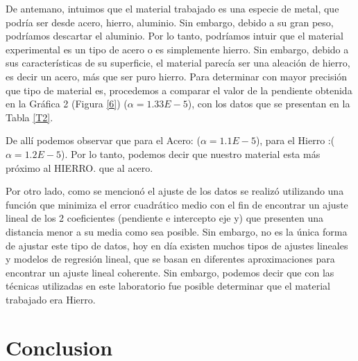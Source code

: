 \documentclass[journal,transmag]{IEEEtran}
\begin{document}
  

De antemano, intuimos que el material trabajado es una especie de metal, que podría ser desde acero, hierro, aluminio. Sin embargo, debido a su gran peso, podríamos descartar el aluminio. Por lo tanto, podríamos intuir que el material experimental es un tipo de acero o es simplemente hierro. Sin embargo, debido a sus características de su superficie, el material parecía ser una aleación de hierro, es decir un acero, más que ser puro hierro. Para determinar con mayor precisión que tipo de material es, procedemos a comparar el valor de la pendiente obtenida en la Gráfica 2 (Figura \ref{6}) ($\alpha= 1.33E-5$), con los datos que se presentan en la Tabla \ref{T2}. 

  

De allí podemos observar que   para el Acero: ($\alpha= 1.1E-5$), para el Hierro :($\alpha= 1.2E-5$). Por lo tanto, podemos decir que nuestro material esta más próximo al HIERRO. que al acero. 

  

Por otro lado, como se mencionó el ajuste de los datos se realizó utilizando una función que minimiza el error cuadrático medio con el fin de encontrar un ajuste lineal de los 2 coeficientes (pendiente e intercepto eje y) que presenten una distancia menor a su media como sea posible. Sin embargo, no es la única forma de ajustar este tipo de datos, hoy en día existen muchos tipos de ajustes lineales y modelos de regresión lineal, que se basan en diferentes aproximaciones para encontrar un ajuste lineal coherente. Sin embargo, podemos decir que con las técnicas utilizadas en este laboratorio fue posible determinar que el material trabajado era Hierro.  


\section{Conclusion}
	
\end{document}
